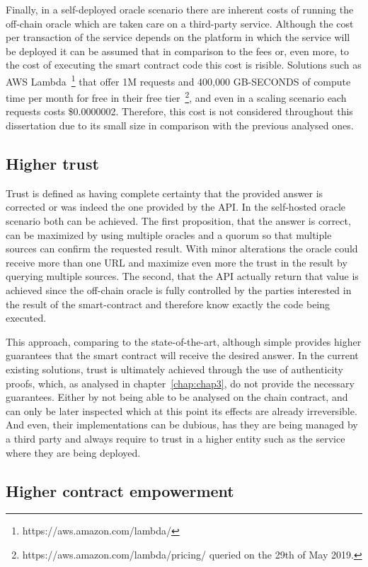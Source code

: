 Finally, in a self-deployed oracle scenario there are inherent costs of running the off-chain oracle which are taken care on a third-party service. Although the cost per transaction of the service depends on the platform in which the service will be deployed it can be assumed that in comparison to the fees or, even more, to the cost of executing the smart contract code this cost is risible. Solutions such as AWS Lambda~\footnote{https://aws.amazon.com/lambda/} that offer 1M requests and 400,000 GB-SECONDS of compute time per month for free in their free tier~\footnote{https://aws.amazon.com/lambda/pricing/ queried on the 29th of May 2019.}, and even in a scaling scenario each requests costs \$0.0000002. Therefore, this cost is not considered throughout this dissertation due to its small size in comparison with the previous analysed ones.

\subsection{Higher trust}

Trust is defined as having complete certainty that the provided answer is corrected or was indeed the one provided by the API. In the self-hosted oracle scenario both can be achieved. The first proposition, that the answer is correct, can be maximized by using multiple oracles and a quorum so that multiple sources can confirm the requested result. With minor alterations the oracle could receive more than one URL and maximize even more the trust in the result by querying multiple sources. The second, that the API actually return that value is achieved since the off-chain oracle is fully controlled by the parties interested in the result of the smart-contract and therefore know exactly the code being executed.

This approach, comparing to the state-of-the-art, although simple provides higher guarantees that the smart contract will receive the desired answer. In the current existing solutions, trust is ultimately achieved through the use of authenticity proofs, which, as analysed in chapter~\ref{chap:chap3}, do not provide the necessary guarantees. Either by not being able to be analysed on the chain contract, and can only be later inspected which at this point its effects are already irreversible. And even, their implementations can be dubious, has they are being managed by a third party and always require to trust in a higher entity such as the service where they are being deployed.



\subsection{Higher contract empowerment}
